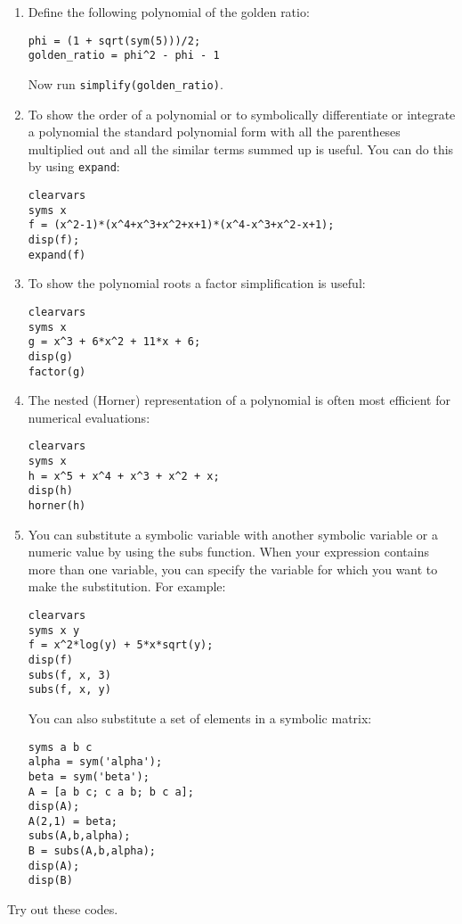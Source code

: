 \begin{enumerate}[resume]

\item
Define the following polynomial of the golden ratio:
\begin{lstlisting}[style=Matlab-editor,basicstyle=\mlttfamily\scriptsize]
phi = (1 + sqrt(sym(5)))/2;
golden_ratio = phi^2 - phi - 1
\end{lstlisting}
Now run \texttt{simplify{(golden\_ratio)}}.

\item
To show the order of a polynomial or to symbolically differentiate or integrate a polynomial
  the standard polynomial form with all the parentheses multiplied out
  and all the similar terms summed up is useful.
You can do this by using \texttt{expand}:
\begin{lstlisting}[style=Matlab-editor,basicstyle=\mlttfamily\scriptsize]
clearvars
syms x
f = (x^2-1)*(x^4+x^3+x^2+x+1)*(x^4-x^3+x^2-x+1);
disp(f);
expand(f)
\end{lstlisting}

\item
To show the polynomial roots a factor simplification is useful:
\begin{lstlisting}[style=Matlab-editor,basicstyle=\mlttfamily\scriptsize]
clearvars
syms x
g = x^3 + 6*x^2 + 11*x + 6;
disp(g)
factor(g)      
\end{lstlisting}

\item
The nested (Horner) representation of a polynomial is often most efficient for numerical evaluations:
\begin{lstlisting}[style=Matlab-editor,basicstyle=\mlttfamily\scriptsize]
clearvars
syms x
h = x^5 + x^4 + x^3 + x^2 + x;
disp(h)
horner(h)
\end{lstlisting}

\item
You can substitute a symbolic variable with another symbolic variable
  or a numeric value by using the subs function.
When your expression contains more than one variable,
  you can specify the variable for which you want to make the substitution. 
For example:
\begin{lstlisting}[style=Matlab-editor,basicstyle=\mlttfamily\scriptsize]
clearvars
syms x y
f = x^2*log(y) + 5*x*sqrt(y);
disp(f)
subs(f, x, 3)
subs(f, x, y)    
\end{lstlisting}
You can also substitute a set of elements in a symbolic matrix:
\begin{lstlisting}[style=Matlab-editor,basicstyle=\mlttfamily\scriptsize]
syms a b c
alpha = sym('alpha');
beta = sym('beta');
A = [a b c; c a b; b c a];
disp(A);
A(2,1) = beta;
subs(A,b,alpha);
B = subs(A,b,alpha);
disp(A);
disp(B)       
\end{lstlisting}
\end{enumerate}
Try out these codes.


